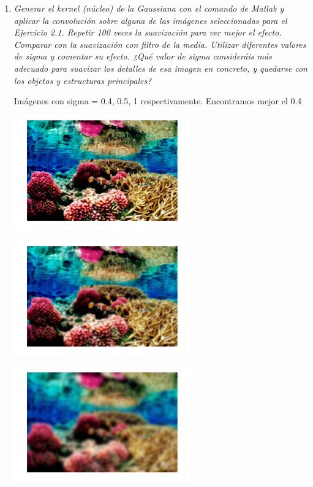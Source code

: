 \documentclass{article}
\begin{document}
\begin{enumerate}
 \begin{enumerate}
 \item \textit{Generar  el  kernel  (núcleo)  de  la  Gaussiana  con  el  comando  de  Matlab  y  aplicar  la 
convolución  sobre alguna  de las imágenes seleccionadas para el Ejercicio  2.1.  Repetir 
100 veces la suavización para ver mejor el efecto. Comparar con la suavización con filtro 
de  la  media. Utilizar  diferentes  valores  de  sigma  y  comentar  su  efecto.  ¿Qué  valor  de 
sigma consideráis más adecuado para suavizar los detalles de esa imagen en concreto, y 
quedarse con los objetos y estructuras principales?}

  Imágenes con sigma = 0.4, 0.5, 1 respectivamente. Encontramos mejor el 0.4
  
 \begin{center}
 \includegraphics[width=0.6\textwidth]{2a(gaussian_04).png}
 \end{center}
 
 \begin{center}
 \includegraphics[width=0.6\textwidth]{2a(gaussian_05).png}
 \end{center}
 
 \begin{center}
 \includegraphics[width=0.6\textwidth]{2a(gaussian_1).png}
 \end{center} 


\end{enumerate}
\end{enumerate}
\end{document}
